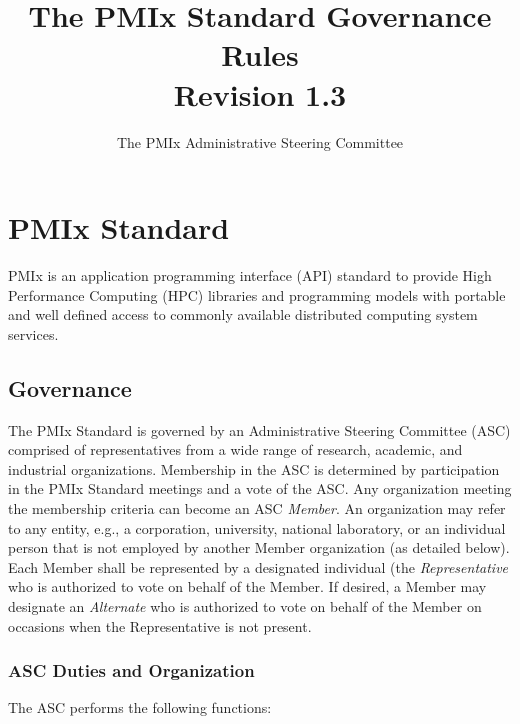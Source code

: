 \documentclass{article}
\begin{document}
\title{The PMIx Standard Governance Rules\\
    Revision 1.3}
\author{The PMIx Administrative Steering Committee}


\maketitle
\newpage

\tableofcontents
\newpage

\hypertarget{pmix-standard}{%
\section{PMIx Standard}\label{pmix-standard}}

PMIx is an application programming interface (API) standard to provide
High Performance Computing (HPC) libraries and programming models with
portable and well defined access to commonly available distributed
computing system services.

\hypertarget{governance}{%
\subsection{Governance}\label{governance}}

The PMIx Standard is governed by an Administrative Steering Committee
(ASC) comprised of representatives from a wide range of research,
academic, and industrial organizations. Membership in the ASC is
determined by participation in the PMIx Standard meetings and a vote of
the ASC. Any organization meeting the membership criteria can become an
ASC \textit{Member}. An organization may refer to any entity, e.g., a
corporation, university, national laboratory, or an individual person
that is not employed by another Member organization (as detailed below).
Each Member shall be represented by a designated individual (the
\textit{Representative} who is authorized to vote on behalf of the Member.
If desired, a Member may designate an \textit{Alternate} who is authorized to
vote on behalf of the Member on occasions when the Representative is not
present.

\subsubsection{ASC Duties and Organization }

The ASC performs the following functions:
\end{document}
